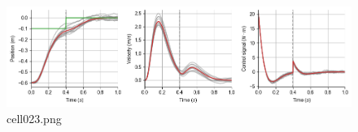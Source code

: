 \begin{figure}[ht]
	\centering
	\includegraphics[scale=0.8, max width=\linewidth]{./fig/motor-learning/infinite-horizon-ofc/cell023.png}
	\caption{cell023.png}
	\label{cell023.png}
\end{figure}